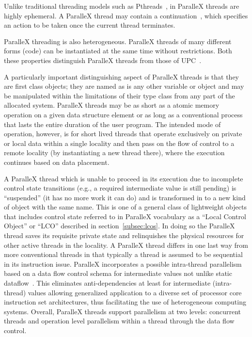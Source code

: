 \documentclass[floatfix]{revtex4}
\begin{document}
Unlike traditional threading models such as Pthreads~\cite{pthreads}, 
in ParalleX threads are highly ephemeral. 
A ParalleX thread may contain a continuation~\cite{continuations},
which specifies an action to be taken once the current thread terminates.

ParalleX threading is also heterogeneous. ParalleX threads of many
different forms (code) can be instantiated at the same time without
restrictions. Both these properties distinguish ParalleX threads from
those of UPC~\cite{upc1,upc2}. 

A particularly important distinguishing aspect of ParalleX threads is that they are first class
objects; they are named as is any other variable or object and may be
manipulated within the limitations of their type class from any
part of the allocated system. ParalleX threads
may be as short as a atomic memory operation on a given data structure
element or as long as a conventional process that lasts the entire
duration of the user program. The intended mode of operation, however, is
for short lived threads that operate exclusively on private or local
data within a single locality and then pass on the flow of control to a remote
locality (by instantiating a new thread there), where the execution continues based on
data placement. 
 
A ParalleX thread which is unable to proceed in its execution due to incomplete control state
transitions (e.g., a required intermediate value is still pending) is
``suspended'' (it has no more work it can do) and is transformed in to a new kind of 
object with the same name. This is one of a general class of lightweight objects that includes
control state referred to in ParalleX vocabulary as a ``Local Control Object''
or ``LCO'' described in section~\ref{subsec:lcos}. In doing so the ParalleX
thread saves its requisite private state and relinquishes the physical
resources for other active threads in the locality. A ParalleX thread differs
in one last way from more conventional threads in that typically a thread
is assumed to be sequential in its instruction issue. ParalleX incorporates
a possible intra-thread parallelism based on a data flow control schema
for intermediate values not unlike static dataflow~\cite{dennisdataflow}. This eliminates
anti-dependencies at least for intermediate (intra-thread) values
allowing generalized application to a diverse set of processor core
instruction set architectures, thus facilitating the use of heterogeneous
computing systems. Overall, ParalleX threads support parallelism at two levels:
concurrent threads and operation level parallelism within a thread through
the data flow control.
\end{document}
